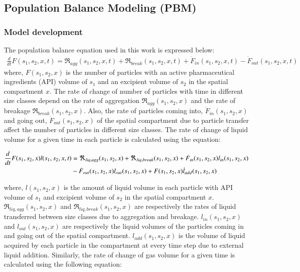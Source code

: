 \documentclass[preprint,11pt,authoryear]{elsarticle}
\begin{document}
\subsection{Population Balance Modeling (PBM)}
\label{sec:pbm_model}
\subsubsection{Model development}
 The population balance equation used in this work is expressed below:
\begin{align}
\frac{d}{dt}F(s_1,s_2,x,t)=\Re_{agg}(s_1,s_2,x,t)+\Re_{break}(s_1,s_2,x,t)+
\dot{F}_{in}(s_1,s_2,x,t)-\dot{F}_{out}(s_1,s_2,x,t)
\label{eqn:mthds_pbm_overall} 
\end{align}
where, $F(s_1,s_2,x)$ is the number of particles with an active pharmaceutical ingredients 
(API) volume of $s_1$ and an excipient 
volume of $s_2$ in the spatial compartment $x$. The rate of change of number of particles with time 
in different size classes depend on the rate of aggregation $\Re_{agg}(s_1,s_2,x)$ and the rate of 
breakage $\Re_{break}(s_1,s_2,x)$. Also, the rate of particles coming into, $\dot{F}_{in}(s_1,s_2,x)$ and 
going out, $\dot{F}_{out}(s_1,s_2,x)$ of the spatial compartment due to particle transfer affect the number of 
particles in different size classes. 
The rate of change of liquid volume for a given time in each particle is calculated using the equation: 

\begin{align}
\frac{d}{dt}F(s_1,s_2,x)l(s_1,s_2,x,t)&= 
\Re_{liq,agg}(s_1,s_2,x)+\Re_{liq,break}(s_1,s_2,x)+\dot{F}_{in}(s_1,s_2,x)l_{in}(s_1,s_2,x)\notag\\
&-\dot{F}_{out}(s_1,s_2,x)l_{out}(s_1,s_2,x)+F(s_1,s_2,x)\dot{l}_{add}(s_1,s_2,x)
\label{eqn:mthds_pbm_rate} 
\end{align}

where, $l(s_1,s_2,x)$ is the amount of liquid volume in each particle with API volume of $s_1$ and 
excipient volume of $s_2$ in the spatial compartment $x$. $\Re_{liq,agg}(s_1,s_2,x)$ and 
$\Re_{liq,break}(s_1,s_2,x)$ are respectively the rates of liquid transferred between size classes due to 
aggregation and breakage. $l_{in}(s_1,s_2,x)$ and $l_{out}(s_1,s_2,x)$ are respectively the liquid 
volumes of the particles coming in and going out of the spatial compartment. $l_{add}(s_1,s_2,x)$ is 
the volume of liquid acquired by each particle in the compartment at every time step due to external 
liquid addition.
Similarly, the rate of change of gas volume for a given time is calculated using the following equation: 
\end{document}
